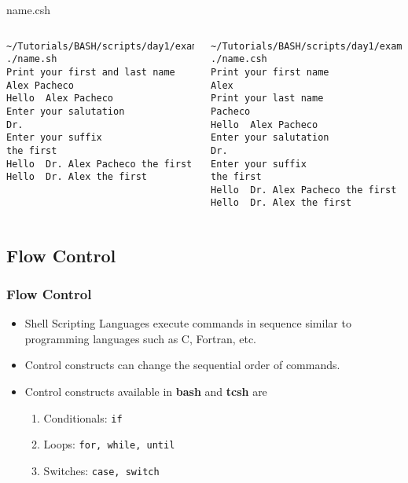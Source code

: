 \documentclass[10pt,t]{beamer}
\begin{document}
\begin{frame}
{\begin{columns}
\begin{block}{name.csh}
        
      \end{block}
    \end{columns}
    \begin{columns}
        \begin{lstlisting}[style=LINUX,basicstyle=\fontsize{3.5}{4.5}\selectfont\ttfamily]
~/Tutorials/BASH/scripts/day1/examples> ./name.sh 
Print your first and last name
Alex Pacheco
Hello  Alex Pacheco
Enter your salutation
Dr.
Enter your suffix
the first
Hello  Dr. Alex Pacheco the first
Hello  Dr. Alex the first
        \end{lstlisting}
        \begin{lstlisting}[style=LINUX,basicstyle=\fontsize{3.5}{4.5}\selectfont\ttfamily]
~/Tutorials/BASH/scripts/day1/examples> ./name.csh 
Print your first name
Alex
Print your last name
Pacheco
Hello  Alex Pacheco
Enter your salutation
Dr.
Enter your suffix
the first
Hello  Dr. Alex Pacheco the first
Hello  Dr. Alex the first
        \end{lstlisting}
    \end{columns}
  }
\end{frame}

\subsection{Flow Control}
\begin{frame}
  \frametitle{Flow Control}
  \begin{itemize}
    \item Shell Scripting Languages execute commands in sequence similar to programming languages such as C, Fortran, etc.
    \item Control constructs can change the sequential order of commands.
    \item Control constructs available in \textbf{bash} and \textbf{tcsh} are
    \begin{enumerate}
        \item Conditionals: \texttt{if}
        \item Loops: \texttt{for, while, until}
        \item Switches: \texttt{case, switch}
    \end{enumerate}
  \end{itemize}
\end{frame}
\end{document}
